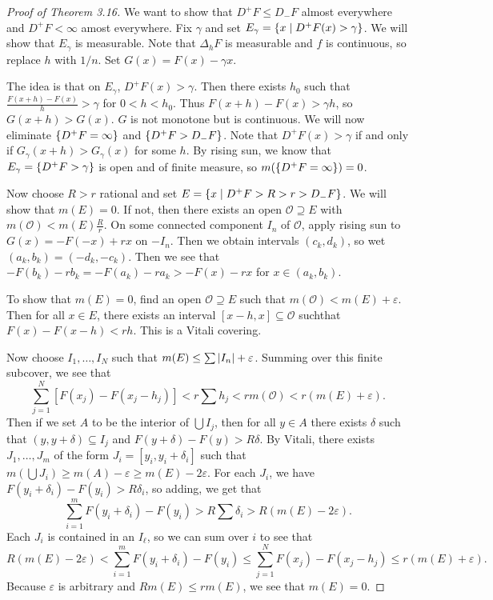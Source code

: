 \documentclass[leqno, openany]{memoir}
\theoremstyle{definition}
\theoremstyle{remark}
\theoremstyle{plain}
\theoremstyle{definition}
\theoremstyle{remark}
\newcommand{\ep}{\varepsilon}
\newcommand{\mc}[1]{\mathcal{#1}}
\begin{document}
\begin{proof}[Proof of Theorem 3.16] We want to show that $D^+ F \leq D_- F$
    almost everywhere and $D^+ F < \infty$ amost everywhere. Fix $\gamma$ and
    set $E_{\gamma} = \qty{x \mid D^+ F(x) > \gamma}$. We will show that
    $E_{\gamma}$ is measurable. Note that $\Delta_h F$ is measurable and $f$ is
    continuous, so replace $h$ with $1/n$. Set $G(x) = F(x) - \gamma x$.

    The idea is that on $E_{\gamma}$, $D^+ F(x) > \gamma$.  Then there exists
    $h_0$ such that $\frac{F(x+h) - F(x)}{h} > \gamma$ for $0 < h < h_0$. Thus
    $F(x+h) - F(x) > \gamma h$, so $G(x+h) > G(x)$. $G$ is not monotone but is
    continuous. We will now eliminate $\qty{D^+ F=  \infty}$ and $\qty{D^+ F >
    D_- F}$. Note that $D^+ F(x) > \gamma$ if and only if $G_{\gamma}(x+h) >
    G_{\gamma}(x)$ for some $h$. By rising sun, we know that $E_{\gamma} =
    \qty{D^+ F > \gamma}$ is open and of finite measure, so $m\qty(\qty{D^+ F =
    \infty}) = 0$.

    Now choose $R > r$ rational and set $E = \qty{x \mid D^+F > R > r > D_-
    F}$. We will show that $m(E) = 0$. If not, then there exists an open
    $\mc{O} \supseteq E$ with $m(\mc{O}) < m(E) \frac{R}{r}$. On some connected
    component $I_n$ of $\mc{O}$, apply rising sun to $G(x) = -F(-x) + rx$ on
    $-I_n$. Then we obtain intervals $(c_k,d_k)$, so wet $(a_k, b_k) = (-d_k,
    -c_k)$. Then we see that $-F(b_k) - rb_k = -F(a_k) - ra_k > -F(x) - rx$ for
    $x \in (a_k,b_k)$.

    To show that $m(E) = 0$, find an open $\mc{O} \supseteq E$ such that
    $m(\mc{O}) < m(E) + \ep$. Then for all $x \in E$, there exists an interval
    $[x-h,x] \subseteq \mc{O}$ suchthat $F(x) - F(x-h) < rh$. This is a Vitali
    covering.

    Now choose $I_1, \ldots, I_N$ such that $m(E) \leq \sum \abs{I_n} + \ep$.
    Summing over this finite subcover, we see that \[ \sum_{j=1}^N [F(x_j) -
    F(x_j - h_j)] < r \sum h_j < rm(\mc{O}) < r(m(E) + \ep). \] Then if we set
    $A$ to be the interior of $\bigcup I_j$, then for all $y \in A$ there
    exists $\delta$ such that $(y,y+\delta) \subseteq I_j$ and $F(y+\delta) -
    F(y) > R \delta$. By Vitali, there exists $J_1, \ldots, J_m$ of the form
    $J_i = [y_i, y_i + \delta_i]$ such that $m(\bigcup J_i) \geq m(A) - \ep
    \geq m(E) - 2 \ep$. For each $J_i$, we have $F(y_i + \delta_i) - F(y_i) > R
    \delta_i$, so adding, we get that \[ \sum_{i=1}^m F(y_i + \delta_i) -
        F(y_i) > R \sum \delta_i > R(m(E) - 2 \ep). \] Each $J_i$ is contained
        in an $I_{\ell}$, so we can sum over $i$ to see that \[ R(m(E) - 2 \ep)
        < \sum_{i=1}^m F(y_i + \delta_i) - F(y_i) \leq \sum_{j=1}^N F(x_j) -
    F(x_j- h_j) \leq r(m(E) + \ep). \] Because $\ep$ is arbitrary and $Rm(E)
\leq r m(E)$, we see that $m(E) = 0$.  \end{proof}
\end{document}
